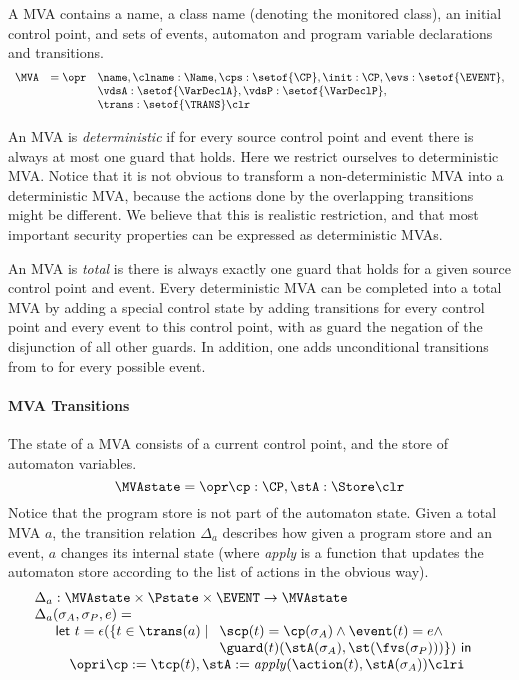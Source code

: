 A MVA contains a name, a class name (denoting the monitored class), an
initial control point, and sets of events, automaton and program
variable declarations and transitions. 
\[
\begin{array}{rcl}
\MVA & = \opr & \name, \clname : \Name, \cps : \setof{\CP},
            \init : \CP, \evs : \setof{\EVENT},\\
     &   &  \vdsA : \setof{\VarDeclA}, \vdsP : \setof{\VarDeclP},\\
     &   &  \trans : \setof{\TRANS} \clr
\end{array}
\]

An MVA is \emph{deterministic} if for every source control
point and event there is always at most one guard that holds. Here we
restrict ourselves to deterministic MVA. Notice that it is not obvious
to transform a non-deterministic MVA into a deterministic MVA, because
the actions done by the overlapping transitions might be different. We
believe that this is realistic restriction, and that most important
security properties can be expressed as deterministic MVAs. 

An MVA is \emph{total} is there is always exactly one guard that holds
for a given source control point and event. Every deterministic MVA
can be completed into a total MVA by adding a special control state
\halted by adding transitions for every control point and every event
to this \halted control point, with as guard the negation of the
disjunction of all other guards. In addition, one adds unconditional
transitions from \halted to \halted for every possible event.

\paragraph{MVA Transitions} The state of a MVA consists of a current control
point, and the store of automaton variables.
\[
\MVAstate = \opr \cp : \CP, \stA : \Store \clr
\]
Notice that the program store is not part of the automaton
state. Given a total MVA \(a\), the transition relation \(\Delta_a\)
describes how given a program store and an event, \(a\) changes its
internal state (where \textit{apply} is a function that updates the
automaton store according to the list of actions in the obvious way).
\[
\begin{array}{l}
\Delta_a  :  \MVAstate \times \Pstate \times \EVENT \rightarrow
\MVAstate\\
\Delta_a(\sigma_A, \sigma_P, e) = \\
\quad
\begin{array}[t]{l}
\mathsf{let\ }t = \epsilon(\{t\in \trans(a)\mid
  \begin{array}[t]{l}
     \scp(t) = \cp(\sigma_A) \wedge \event(t) = e \wedge \\
     \guard(t)(\stA(\sigma_A), \st(\fvs(\sigma_P)))\}) \mathsf{\ in}
  \end{array}\\
\quad \opri \cp := \tcp(t), \stA := \mathit{apply}(\action(t),
\stA(\sigma_A)) \clri
\end{array}

\end{array}
\]

